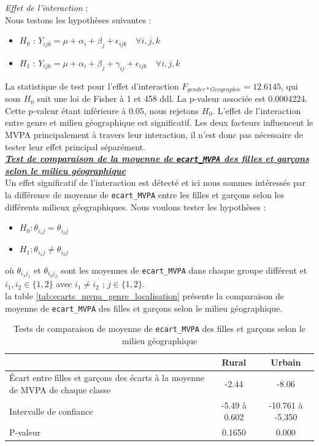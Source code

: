 \documentclass[12pt,a4paper]{article}
\begin{document}
\begin{enumerate}[label=\textbf{\alph*})]
	\noindent
	\textit{Effet de l'interaction} : \\
	Nous testons les hypothèses suivantes :
	\begin{itemize}[label=--, leftmargin=*]
		\item \textbf{$H_0$} : $Y_{ijk} = \mu + \alpha_i + \beta_j + \epsilon_{ijk} \quad \forall i,j,k$ 
		\item \textbf{$H_1$} : $Y_{ijk} = \mu + \alpha_i + \beta_j + \gamma_{ij} + \epsilon_{ijk} \quad \forall i,j,k$
	\end{itemize}
	La statistique de test pour l'effet d'interaction $F_{gender*Geographie} = 12.6145$, qui sous $H_0$ suit une loi de Fisher à 1 et 458 ddl. La p-valeur associée est 0.0004224. Cette p-valeur étant inférieure à 0.05, nous rejetons $H_0$. L'effet de l'interaction entre genre et milieu géographique est significatif. Les deux facteurs influencent le MVPA principalement à travers leur interaction, il n'est donc pas nécessaire de tester leur effet principal séparément.\\
	
	\noindent
	\textbf{\textit{\underline{Test de comparaison  de la moyenne de \texttt{ecart\_MVPA} des filles et garçons selon le milieu géographique}}} \\
	
	Un effet significatif de l'interaction est détecté et ici nous sommes intéressés par la différence de moyenne de \texttt{ecart\_MVPA} entre les filles et garçons selon les différents milieux géographiques. Nous voulons tester les hypothèses : 
	\begin{itemize}[label=--, leftmargin=*]
		\item $H_0 : \theta_{i_1j} = \theta_{i_2j}$
		\item $H_1 : \theta_{i_1j} \neq \theta_{i_2j}$
	\end{itemize}
	où $\theta_{i_1j_1}$ et $\theta_{i_2j_2}$ sont les moyennes de \texttt{ecart\_MVPA} dans chaque groupe différent et $i_1,i_2\in{\{1, 2\}} $ avec $ i_1 \neq i_2$ ; $j\in{\{1,2\}}$.\\
	la table \ref{tab:ecarts_mvpa_genre_localisation} présente la comparaison de moyenne de \texttt{ecart\_MVPA} des filles et garçons selon le milieu géographique.
	\begin{table}[H]
		\centering
		\caption{Tests de comparaison de moyenne de \texttt{ecart\_MVPA} des filles et garçons selon le milieu géographique}
		\begin{tabular}{|p{5cm}|c|c|}
			\hline
			& Rural & Urbain \\ 
			\hline
			Écart entre filles et garçons des écarts à la moyenne de MVPA de chaque classe & -2.44 & -8.06 \\ 
			\hline
			Intervalle de confiance & -5.49 à 0.602 & -10.761 à -5.350 \\ 
			\hline
			P-valeur & 0.1650 & 0.000 \\ 
			\hline
		\end{tabular}
		

\end{table}
\end{enumerate}
\end{document}
